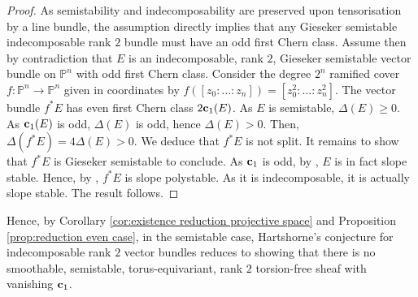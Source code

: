 \documentclass[a4paper,10pt]{amsart}
\theoremstyle{plain}{
    \newtheorem{theorem}{Theorem}[section]
    \newtheorem{lemma}[theorem]{Lemma}
    \newtheorem{corollary}[theorem]{Corollary}
    \newtheorem{proposition}[theorem]{Proposition}
    \newtheorem{conjecture}[theorem]{Conjecture}
}
\theoremstyle{definition}{
    \newtheorem{definition}[theorem]{Definition}
    \newtheorem{defn-thm}[theorem]{Definition-Theorem}
    \newtheorem{example}[theorem]{Example}
    \newtheorem{notation}[theorem]{Notation}
}
\theoremstyle{remark}{
    \newtheorem{remark}[theorem]{Remark}
    \newtheorem{problem}[theorem]{Problem}
    \newtheorem{question}[theorem]{Question}
}
\def\uc{{\bf c}}
\def\P{\mathbb{P}}
\begin{document}
\begin{proof}
As semistability and indecomposability are preserved upon tensorisation by a line bundle, the assumption directly implies that any Gieseker semistable indecomposable rank $2$ bundle must have an odd first Chern class. Assume then by contradiction that $E$ is an indecomposable, rank $2$, Gieseker semistable vector bundle on $\P^n$ with odd first Chern class. Consider the degree $2^n$ ramified cover $f :\P^n \to \P^n$ given in coordinates by $f([z_0:\ldots :z_n])=[z_0^2:\ldots:z_n^2]$. The vector bundle $f^* E$ has even first Chern class $2\uc_1(E)$. As $E$ is semistable, $\Delta(E)\geq 0$. As $\uc_1(E)$ is odd, $\Delta(E)$ is odd, hence $\Delta(E) >0$. Then, $\Delta(f^*E)=4\Delta(E) >0$. We deduce that $f^*E$ is not split. It remains to show that $f^*E$ is Gieseker semistable to conclude. As $\uc_1$ is odd, by \cite[Lemma 1.2.13 and 1.2.14]{HuLe}, $E$ is in fact slope stable. Hence, by \cite[Lemma 3.2.3]{HuLe}, $f^*E$ is slope polystable. As it is indecomposable, it is actually slope stable. The result follows.
\end{proof}
Hence, by Corollary \ref{cor:existence reduction projective space} and Proposition \ref{prop:reduction even case}, in the semistable case, Hartshorne's conjecture for indecomposable rank $2$ vector bundles reduces to showing that there is no smoothable, semistable, torus-equivariant, rank $2$ torsion-free sheaf with vanishing $\uc_1$.
\end{document}
